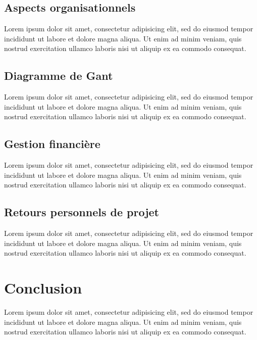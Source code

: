 \documentclass[a4paper,12pt]{report}
\begin{document}
	\section{Aspects organisationnels}
	Lorem ipsum dolor sit amet, consectetur adipisicing elit, sed do eiusmod tempor incididunt ut labore et dolore magna aliqua. Ut enim ad minim veniam, quis nostrud exercitation ullamco laboris nisi ut aliquip ex ea commodo consequat.
	
	\section{Diagramme de Gant}
	Lorem ipsum dolor sit amet, consectetur adipisicing elit, sed do eiusmod tempor incididunt ut labore et dolore magna aliqua. Ut enim ad minim veniam, quis nostrud exercitation ullamco laboris nisi ut aliquip ex ea commodo consequat.
	
	\section{Gestion financière}
	Lorem ipsum dolor sit amet, consectetur adipisicing elit, sed do eiusmod tempor incididunt ut labore et dolore magna aliqua. Ut enim ad minim veniam, quis nostrud exercitation ullamco laboris nisi ut aliquip ex ea commodo consequat.
	
	\section{Retours personnels de projet}
	Lorem ipsum dolor sit amet, consectetur adipisicing elit, sed do eiusmod tempor incididunt ut labore et dolore magna aliqua. Ut enim ad minim veniam, quis nostrud exercitation ullamco laboris nisi ut aliquip ex ea commodo consequat.
	

\chapter{Conclusion}
Lorem ipsum dolor sit amet, consectetur adipisicing elit, sed do eiusmod tempor incididunt ut labore et dolore magna aliqua. Ut enim ad minim veniam, quis nostrud exercitation ullamco laboris nisi ut aliquip ex ea commodo consequat.
\end{document}
